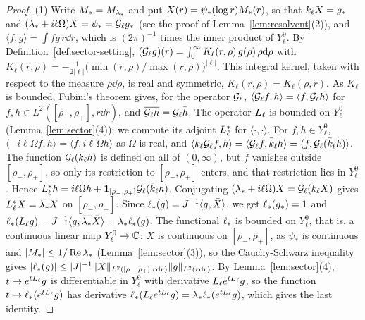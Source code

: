 \begin{proof}
(1) Write $M_*=M_{\lambda_*}$ and put $X(r)=\psi_*(\log r)M_*(r)$, so that $k_\ell X=g_*$ and
$(\lambda_*+i\ell\Omega)X=\psi_*=\mathcal{G}_\ell g_*$ (see the proof of
Lemma~\ref{lem:resolvent}(2)), and
$\langle f,g\rangle=\int f\bar g\,r\dd r$, which is $(2\pi)^{-1}$ times the inner
product of $Y^0_\ell$. By Definition~\ref{def:sector-setting},
$(\mathcal{G}_\ell g)(r)=\int_0^\infty K_\ell(r,\rho)\,g(\rho)\,\rho\dd\rho$ with
$K_\ell(r,\rho)=-\frac1{2|\ell|}\big(\min(r,\rho)/\max(r,\rho)\big)^{|\ell|}$. This
integral kernel, taken with respect to the measure $\rho\dd\rho$, is real and
symmetric, $K_\ell(r,\rho)=K_\ell(\rho,r)$. As $K_\ell$ is bounded, Fubini's
theorem gives, for the operator $\mathcal{G}_\ell$, $\langle\mathcal{G}_\ell f,h\rangle=\langle f,\mathcal{G}_\ell h\rangle$
for $f,h\in L^2([\rho_-,\rho_+],r\dd r)$, and $\overline{\mathcal{G}_\ell h}=\mathcal{G}_\ell\bar h$.
The operator $L_{\ell}$ is bounded on $Y^0_\ell$ (Lemma~\ref{lem:sector}(4)); we
compute its adjoint $L_{\ell}^*$ for $\langle\cdot,\cdot\rangle$. For
$f,h\in Y^0_\ell$, $\langle-i\ell\Omega f,h\rangle=\langle f,i\ell\Omega h\rangle$ as
$\Omega$ is real, and
$\langle k_\ell\mathcal{G}_\ell f,h\rangle=\langle\mathcal{G}_\ell f,\bar{k}_\ell h\rangle
=\langle f,\mathcal{G}_\ell(\bar{k}_\ell h)\rangle$. The function
$\mathcal{G}_\ell(\bar{k}_\ell h)$ is defined on all of $(0,\infty)$, but $f$ vanishes
outside $[\rho_-,\rho_+]$, so only its restriction to $[\rho_-,\rho_+]$ enters, and
that restriction lies in $Y^0_\ell$. Hence
$L_{\ell}^*h=i\ell\Omega h+\mathbf 1_{[\rho_-,\rho_+]}\mathcal{G}_\ell(\bar{k}_\ell h)$.
Conjugating $(\lambda_*+i\ell\Omega)X=\mathcal{G}_\ell(k_\ell X)$ gives
$L_{\ell}^*\bar X=\overline{\lambda_*}\bar X$ on $[\rho_-,\rho_+]$. Since
$\ell_*(g)=J^{-1}\langle g,\bar X\rangle$, we get $\ell_*(g_*)=1$ and
$\ell_*(L_{\ell}g)=J^{-1}\langle g,\overline{\lambda_*}\bar X\rangle=\lambda_*\ell_*(g)$.
The functional $\ell_*$ is bounded on $Y^0_\ell$, that is, a continuous linear map
$Y^0_\ell\to\mathbb{C}$: $X$ is continuous on $[\rho_-,\rho_+]$, as $\psi_*$ is continuous and
$|M_*|\le1/\Re\lambda_*$ (Lemma~\ref{lem:sector}(3)), so the Cauchy-Schwarz
inequality gives
$|\ell_*(g)|\le|J|^{-1}\|X\|_{L^2([\rho_-,\rho_+],r\dd r)}\|g\|_{L^2(r\dd r)}$.
By Lemma~\ref{lem:sector}(4), $t\mapsto e^{tL_{\ell}}g$ is differentiable in
$Y^0_\ell$ with derivative $L_{\ell}e^{tL_{\ell}}g$, so the function
$t\mapsto\ell_*(e^{tL_{\ell}}g)$ has derivative
$\ell_*(L_{\ell}e^{tL_{\ell}}g)=\lambda_*\ell_*(e^{tL_{\ell}}g)$, which gives the
last identity.


\end{proof}
